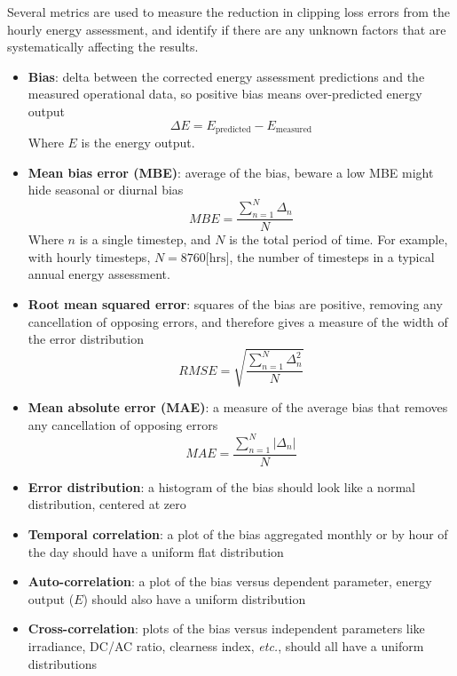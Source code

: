 \documentclass[conference]{IEEEtran}
\begin{document}
Several metrics are used to measure the reduction in clipping loss errors from the hourly energy assessment, and identify if there are any unknown factors that are systematically affecting the results.

\begin{itemize}
\item \textbf{Bias}: delta between the corrected energy assessment predictions and the measured operational data, so positive bias means over-predicted energy output 
\begin{equation}
\Delta E={E_\text{predicted}} - {E_\text{measured}}\label{eq:bias}
\end{equation}
Where $E$ is the energy output.
\item \textbf{Mean bias error (MBE)}: average of the bias, beware a low MBE might hide seasonal or diurnal bias
\begin{equation}
\mathit{MBE}=\frac{\sum_{n=1}^N{\Delta_n}}{N}\label{eq:mbe}
\end{equation}
Where $n$ is a single timestep, and $N$ is the total period of time. For example, with hourly timesteps, $N=8760\text{[hrs]}$, the number of timesteps in a typical annual energy assessment.
\item \textbf{Root mean squared error}: squares of the bias are positive, removing any cancellation of opposing errors, and therefore gives a measure of the width of the error distribution
\begin{equation}
\mathit{RMSE}=\sqrt{\frac{\sum_{n=1}^N{\Delta_n^2}}{N}}\label{eq:rmse}
\end{equation}
\item \textbf{Mean absolute error (MAE)}: a measure of the average bias that removes any cancellation of opposing errors
\begin{equation}
\mathit{MAE}=\frac{\sum_{n=1}^N{\left|\Delta_n\right|}}{N}\label{eq:mae}
\end{equation}
\item \textbf{Error distribution}: a histogram of the bias should look like a normal distribution, centered at zero
\item \textbf{Temporal correlation}: a plot of the bias aggregated monthly or by hour of the day should have a uniform flat distribution
\item \textbf{Auto-correlation}: a plot of the bias versus dependent parameter, energy output ($E$) should also have a uniform distribution
\item \textbf{Cross-correlation}: plots of the bias versus independent parameters like irradiance, DC/AC ratio, clearness index, \textit{etc.}, should all have a uniform distributions
\end{itemize}
\end{document}
